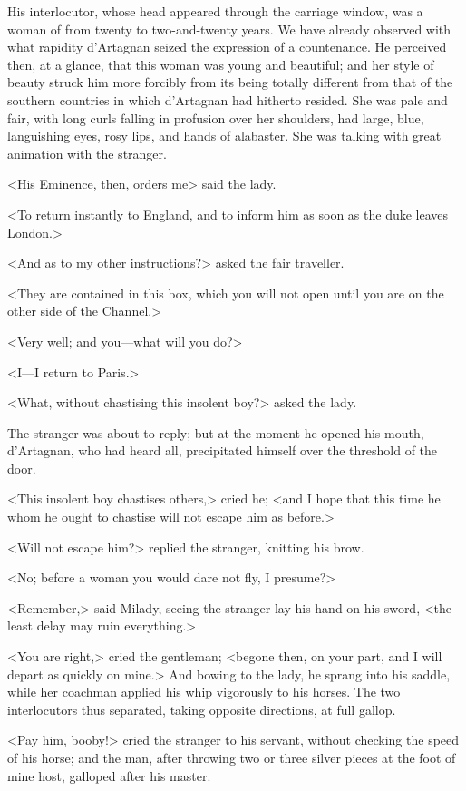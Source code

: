 His interlocutor, whose head appeared through the carriage window, was a woman of from twenty to two-and-twenty years. We have already observed with what rapidity d'Artagnan seized the expression of a countenance. He perceived then, at a glance, that this woman was young and beautiful; and her style of beauty struck him more forcibly from its being totally different from that of the southern countries in which d'Artagnan had hitherto resided. She was pale and fair, with long curls falling in profusion over her shoulders, had large, blue, languishing eyes, rosy lips, and hands of alabaster. She was talking with great animation with the stranger. 

<His Eminence, then, orders me\longdash> said the lady. 

<To return instantly to England, and to inform him as soon as the duke leaves London.> 

<And as to my other instructions?> asked the fair traveller. 

<They are contained in this box, which you will not open until you are on the other side of the Channel.> 

<Very well; and you---what will you do?> 

<I---I return to Paris.> 

<What, without chastising this insolent boy?> asked the lady. 

The stranger was about to reply; but at the moment he opened his mouth, d'Artagnan, who had heard all, precipitated himself over the threshold of the door. 

<This insolent boy chastises others,> cried he; <and I hope that this time he whom he ought to chastise will not escape him as before.> 

<Will not escape him?> replied the stranger, knitting his brow. 

<No; before a woman you would dare not fly, I presume?> 

<Remember,> said Milady, seeing the stranger lay his hand on his sword, <the least delay may ruin everything.> 

<You are right,> cried the gentleman; <begone then, on your part, and I will depart as quickly on mine.> And bowing to the lady, he sprang into his saddle, while her coachman applied his whip vigorously to his horses. The two interlocutors thus separated, taking opposite directions, at full gallop. 

<Pay him, booby!> cried the stranger to his servant, without checking the speed of his horse; and the man, after throwing two or three silver pieces at the foot of mine host, galloped after his master. 

